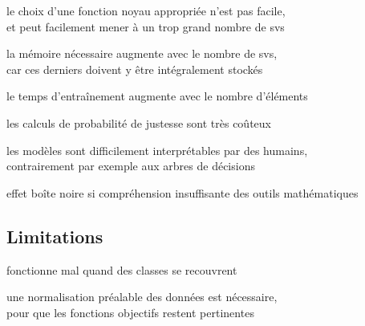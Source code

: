 \begin{itmz}
\item{le choix d’une fonction noyau appropriée n’est pas facile,\\
et peut facilement mener à un trop grand nombre de \glspl{sv}}
\item{la mémoire nécessaire augmente avec le nombre de \glspl{sv},\\
car ces derniers doivent y être intégralement stockés}
\item{le temps d’entraînement augmente avec le nombre d’éléments}
\item{les calculs de probabilité de justesse sont très coûteux}
\item{les modèles sont difficilement interprétables par des humains,\\
contrairement par exemple aux arbres de décisions}
\item{effet boîte noire si compréhension insuffisante des outils mathématiques}
\end{itmz}

\subsection{Limitations}

\begin{itmz}
\item{fonctionne mal quand des classes se recouvrent}
\item{une normalisation préalable des données est nécessaire,\\
pour que les fonctions objectifs restent pertinentes}
\end{itmz}

\pagebreak
